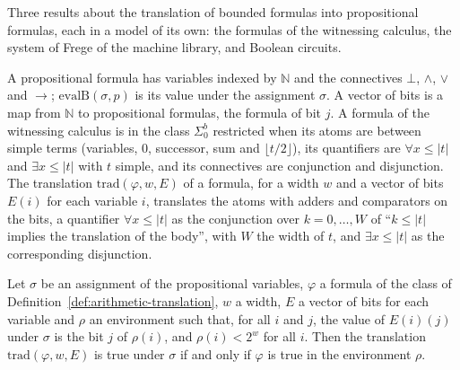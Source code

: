 Three results about the translation of bounded formulas into propositional formulas, each in a model
of its own: the formulas of the witnessing calculus, the system of Frege of the machine library, and
Boolean circuits.

\begin{definition}
  \label{def:arithmetic-translation}
  \leanok
  \own{}
  \infrastructure{}
  A propositional formula has variables indexed by $\mathbb{N}$ and the connectives $\bot$, $\wedge$,
  $\vee$ and $\to$; $\mathrm{evalB}(\sigma, p)$ is its value under the assignment $\sigma$. A vector
  of bits is a map from $\mathbb{N}$ to propositional formulas, the formula of bit $j$. A formula of
  the witnessing calculus is in the class $\Sigma^b_0$ restricted when its atoms are between simple
  terms (variables, $0$, successor, sum and $\lfloor t/2 \rfloor$), its quantifiers are $\forall x
  \le |t|$ and $\exists x \le |t|$ with $t$ simple, and its connectives are conjunction and
  disjunction. The translation $\mathrm{trad}(\varphi, w, E)$ of a formula, for a width $w$ and a
  vector of bits $E(i)$ for each variable $i$, translates the atoms with adders and comparators on
  the bits, a quantifier $\forall x \le |t|$ as the conjunction over $k = 0, \dots, W$ of ``$k \le
  |t|$ implies the translation of the body'', with $W$ the width of $t$, and $\exists x \le |t|$ as
  the corresponding disjunction.
\end{definition}

\begin{theorem}
  \label{thm:arithmetic-trad-eval}
  \leanok
  Let $\sigma$ be an assignment of the propositional variables, $\varphi$ a formula of the class of
  Definition~\ref{def:arithmetic-translation}, $w$ a width, $E$ a vector of bits for each variable and
  $\rho$ an environment such that, for all $i$ and $j$, the value of $E(i)(j)$ under $\sigma$ is the
  bit $j$ of $\rho(i)$, and $\rho(i) < 2^w$ for all $i$. Then the translation $\mathrm{trad}(\varphi,
  w, E)$ is true under $\sigma$ if and only if $\varphi$ is true in the environment $\rho$.
\end{theorem}

